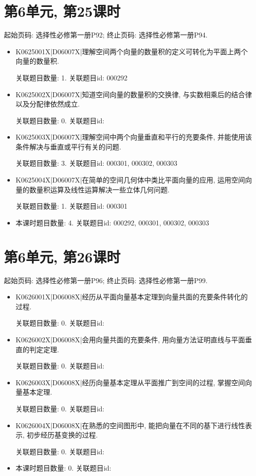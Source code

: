 \section*{第6单元, 第25课时}
起始页码: 选择性必修第一册P92; 终止页码: 选择性必修第一册P94.
\begin{itemize}
\item K0625001X|D06007X|理解空间两个向量的数量积的定义可转化为平面上两个向量的数量积.

关联题目数量: 1. 关联题目id: 000292

\item K0625002X|D06007X|知道空间向量的数量积的交换律, 与实数相乘后的结合律以及分配律依然成立.

关联题目数量: 0. 关联题目id: 

\item K0625003X|D06007X|理解空间中两个向量垂直和平行的充要条件, 并能使用该条件解决与垂直或平行有关的问题.

关联题目数量: 3. 关联题目id: 000301, 000302, 000303

\item K0625004X|D06007X|在简单的空间几何体中类比平面向量的应用, 运用空间向量的数量积运算及线性运算解决一些立体几何问题.

关联题目数量: 1. 关联题目id: 000301

\item 本课时题目数量: 4. 关联题目id: 000292, 000301, 000302, 000303

\end{itemize}

\section*{第6单元, 第26课时}
起始页码: 选择性必修第一册P96; 终止页码: 选择性必修第一册P99.
\begin{itemize}
\item K0626001X|D06008X|经历从平面向量基本定理到向量共面的充要条件转化的过程.

关联题目数量: 0. 关联题目id: 

\item K0626002X|D06008X|会用向量共面的充要条件, 用向量方法证明直线与平面垂直的判定定理.

关联题目数量: 0. 关联题目id: 

\item K0626003X|D06008X|经历向量基本定理从平面推广到空间的过程, 掌握空间向量基本定理.

关联题目数量: 0. 关联题目id: 

\item K0626004X|D06008X|在熟悉的空间图形中, 能把向量在不同的基下进行线性表示, 初步经历基变换的过程.

关联题目数量: 0. 关联题目id: 

\item 本课时题目数量: 0. 关联题目id: 

\end{itemize}

